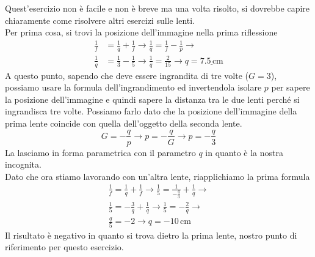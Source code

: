 \begin{center}
\end{center}
\divisor

Quest'esercizio non è facile e non è breve ma una volta risolto, si dovrebbe capire chiaramente come
risolvere altri esercizi sulle lenti.\\
Per prima cosa, si trovi la posizione dell'immagine nella prima riflessione
\begin{align*}
  \frac{1}{f} &= \frac{1}{q} + \frac{1}{f} \rightarrow
  \frac{1}{q} = \frac{1}{f} - \frac{1}{p} \rightarrow\\
  \frac{1}{q} &= \frac{1}{3} - \frac{1}{5} \rightarrow
  \frac{1}{q} = \frac{2}{15} \rightarrow q = \underline{7.5\,\text{cm}}
\end{align*}
A questo punto, sapendo che deve essere ingrandita di tre volte ($G = 3$), possiamo usare la formula
dell'ingrandimento ed invertendola isolare $p$ per sapere la posizione dell'immagine e quindi sapere
la distanza tra le due lenti perché si ingrandisca tre volte. Possiamo farlo dato che la posizione 
dell'immagine della prima lente coincide con quella dell'oggetto della seconda lente.
\begin{equation*}
  G = -\frac{q}{p} \rightarrow p = -\frac{q}{G} \rightarrow p = -\frac{q}{3}
\end{equation*}
La lasciamo in forma parametrica con il parametro $q$ in quanto è la nostra incognita.\\
Dato che ora stiamo lavorando con un'altra lente, riapplichiamo la prima formula
\begin{align*}
  \frac{1}{f} = \frac{1}{q} + \frac{1}{f} \rightarrow
  \frac{1}{5} = \frac{1}{-\frac{q}{3}} + \frac{1}{q} \rightarrow\\
  \frac{1}{5} = -\frac{3}{q} + \frac{1}{q} \rightarrow
  \frac{1}{5} = -\frac{2}{q} \rightarrow\\
  \frac{q}{5} = -2 \rightarrow
  q = \boxed{-10\,\text{cm}}
\end{align*}
Il risultato è negativo in quanto si trova dietro la prima lente, nostro punto di riferimento per
questo esercizio.

